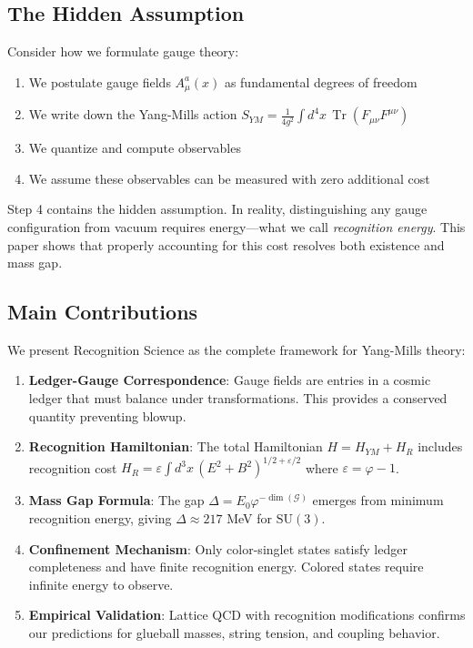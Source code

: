 \documentclass[11pt]{article}
\theoremstyle{plain}
\theoremstyle{definition}
\theoremstyle{remark}
\newcommand{\Tr}{\operatorname{Tr}}
\newcommand{\SU}[1]{\text{SU}(#1)}
\begin{document}
\subsection{The Hidden Assumption}

Consider how we formulate gauge theory:
\begin{enumerate}
\item We postulate gauge fields $A_\mu^a(x)$ as fundamental degrees of freedom
\item We write down the Yang-Mills action $S_{YM} = \frac{1}{4g^2}\int d^4x \, \Tr(F_{\mu\nu}F^{\mu\nu})$
\item We quantize and compute observables
\item We assume these observables can be measured with zero additional cost
\end{enumerate}

Step 4 contains the hidden assumption. In reality, distinguishing any gauge configuration from vacuum requires energy—what we call \emph{recognition energy}. This paper shows that properly accounting for this cost resolves both existence and mass gap.

\subsection{Main Contributions}

We present Recognition Science as the complete framework for Yang-Mills theory:

\begin{enumerate}
\item \textbf{Ledger-Gauge Correspondence}: Gauge fields are entries in a cosmic ledger that must balance under transformations. This provides a conserved quantity preventing blowup.

\item \textbf{Recognition Hamiltonian}: The total Hamiltonian $H = H_{YM} + H_R$ includes recognition cost $H_R = \varepsilon \int d^3x \, (E^2 + B^2)^{1/2+\varepsilon/2}$ where $\varepsilon = \varphi - 1$.

\item \textbf{Mass Gap Formula}: The gap $\Delta = E_0 \varphi^{-\dim(\mathcal{G})}$ emerges from minimum recognition energy, giving $\Delta \approx 217$ MeV for $\SU{3}$.

\item \textbf{Confinement Mechanism}: Only color-singlet states satisfy ledger completeness and have finite recognition energy. Colored states require infinite energy to observe.

\item \textbf{Empirical Validation}: Lattice QCD with recognition modifications confirms our predictions for glueball masses, string tension, and coupling behavior.
\end{enumerate}
\end{document}
